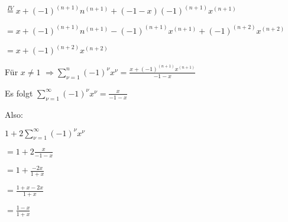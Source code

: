 $ \overset{IV}{=} x + (-1)^{(n+1)} n^{(n+1)} + (-1-x) (-1)^{(n+1)} x^{(n+1)}$

$ =  x + (-1)^{(n+1)} n^{(n+1)} - (-1)^{(n+1)} x^{(n+1)} + (-1)^{(n+2)} x^{(n+2)}$

$ = x + (-1)^{(n+2)}x^{(n+2)}$

Für $x \neq 1 $
$\Rightarrow \sum\limits^{n}_{\nu=1}(-1)^{\nu}x^{\nu} = \frac{x+(-1)^{(n+1)}x^{(n+1)}}{-1-x}$ 

Es folgt $\sum\limits^{\infty}_{\nu=1}(-1)^{\nu}x^{\nu} = \frac{x}{-1-x}$

Also:

$1+2\sum\limits^{\infty}_{\nu=1}(-1)^{\nu}x^{\nu} $

$ = 1+2\frac{x}{-1-x}$

$ = 1 + \frac{-2x}{1+x}$

$ = \frac{1+x-2x}{1+x}$

$ = \frac{1-x}{1+x}$


